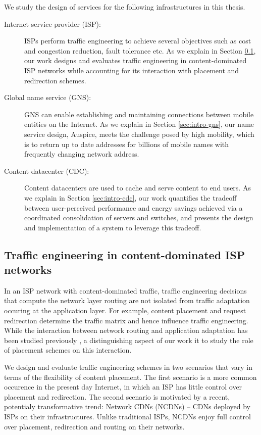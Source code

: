 We study the design of services for the following infrastructures in this thesis.

\begin{description}
	\item[Internet service provider (ISP):] ISPs perform traffic engineering to achieve several objectives such as cost and congestion reduction, fault tolerance etc. As we explain in Section \ref{sec:intro-te}, our work designs and evaluates traffic engineering in content-dominated ISP networks while accounting for its interaction with placement and redirection schemes. 
	\item[Global name service (GNS):] GNS can enable establishing and maintaining connections between mobile entities on the Internet. As we explain in Section \ref{sec:intro-gns}, our name service design, Auspice, meets the challenge posed by high mobility, which is to return up to date addresses for billions of mobile names with frequently changing network address.
	\item[Content datacenter (CDC):] Content datacenters are used to cache and serve content to end users. As we explain in Section \ref{sec:intro-cdc}, our work quantifies the tradeoff between user-perceived performance and energy savings achieved via a coordinated consolidation of servers and switches, and presents the design and implementation of a system to leverage this tradeoff.
\end{description}

\subsection{Traffic engineering in content-dominated ISP networks}
\label{sec:intro-te}
In an ISP network with content-dominated traffic, traffic engineering decisions that compute the network layer routing are not isolated from traffic adaptation occuring at the application layer. For example, content placement and request redirection determine the traffic matrix and hence influence traffic engineering. While the interaction between network routing and application adaptation has been studied previously \cite{Roughgarden,selfishQiu,Jiang2009,JohariGameTheory, CATE, P4P}, a distinguishing aspect of our work it to study the role of placement schemes on this interaction.

We design and evaluate traffic engineering schemes in two scenarios that vary in terms of the flexibility of content placement. The first scenario is a more common occurence in the present day Internet, in which an ISP has little control over placement and redirection. The second scenario is motivated by a recent, potentialy transformative trend: Network CDNs (NCDNs) -- CDNs deployed by ISPs on their infrastructures. Unlike traditional ISPs, NCDNs enjoy full control over placement, redirection and routing on their networks.


